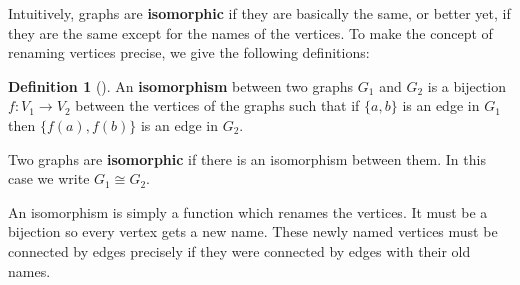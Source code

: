 \documentclass[10pt,]{book}
\newcommand{\terminology}[1]{\textbf{#1}}
\theoremstyle{plain}
\theoremstyle{definition}
\newtheorem{definition}[theorem]{Definition}
\theoremstyle{definition}
\theoremstyle{definition}
\numberwithin{equation}{chapter}
\def\isom{\cong}
\begin{document}
\hypertarget{p-51}{}%
Intuitively, graphs are \terminology{isomorphic}  if they are basically the same, or better yet, if they are the same except for the names of the vertices. To make the concept of renaming vertices precise, we give the following definitions:%
\begin{definition}[{}]\label{definition-2}
\hypertarget{p-52}{}%
 An \terminology{isomorphism} between two graphs \(G_1\) and \(G_2\) is a bijection \(f:V_1 \to V_2\) between the vertices of the graphs such that if \(\{a,b\}\) is an edge in \(G_1\) then \(\{f(a), f(b)\}\) is an edge in \(G_2\).%
\par
\hypertarget{p-53}{}%
Two graphs are \terminology{isomorphic} if there is an isomorphism between them. In this case we write \(G_1 \isom G_2\).%
\end{definition}
\hypertarget{p-54}{}%
An isomorphism is simply a function which renames the vertices. It must be a bijection so every vertex gets a new name. These newly named vertices must be connected by edges precisely if they were connected by edges with their old names.%
\end{document}
